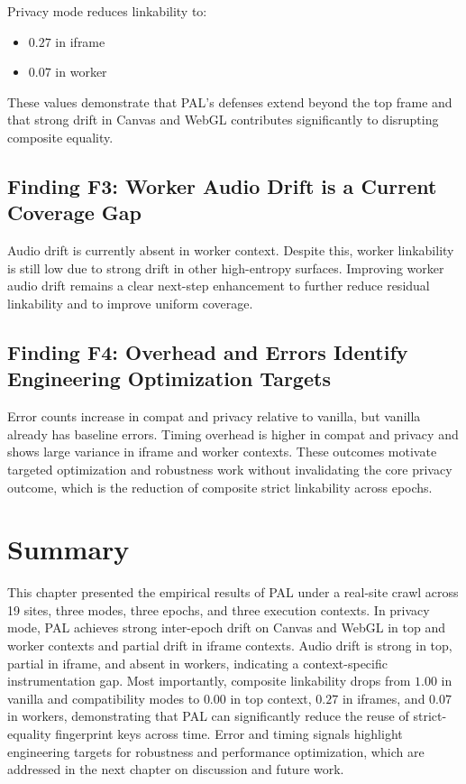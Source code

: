 \documentclass[11pt]{report}
\begin{document}
Privacy mode reduces linkability to:
\begin{itemize}
    \item $0.27$ in iframe
    \item $0.07$ in worker
\end{itemize}

These values demonstrate that PAL’s defenses extend beyond the top frame and that strong drift in Canvas and WebGL contributes significantly to disrupting composite equality.

\subsection{Finding F3: Worker Audio Drift is a Current Coverage Gap}

Audio drift is currently absent in worker context. Despite this, worker linkability is still low due to strong drift in other high-entropy surfaces. Improving worker audio drift remains a clear next-step enhancement to further reduce residual linkability and to improve uniform coverage.

\subsection{Finding F4: Overhead and Errors Identify Engineering Optimization Targets}

Error counts increase in compat and privacy relative to vanilla, but vanilla already has baseline errors. Timing overhead is higher in compat and privacy and shows large variance in iframe and worker contexts. These outcomes motivate targeted optimization and robustness work without invalidating the core privacy outcome, which is the reduction of composite strict linkability across epochs.

\section{Summary}

This chapter presented the empirical results of PAL under a real-site crawl across 19 sites, three modes, three epochs, and three execution contexts. In privacy mode, PAL achieves strong inter-epoch drift on Canvas and WebGL in top and worker contexts and partial drift in iframe contexts. Audio drift is strong in top, partial in iframe, and absent in workers, indicating a context-specific instrumentation gap. Most importantly, composite linkability drops from $1.00$ in vanilla and compatibility modes to $0.00$ in top context, $0.27$ in iframes, and $0.07$ in workers, demonstrating that PAL can significantly reduce the reuse of strict-equality fingerprint keys across time. Error and timing signals highlight engineering targets for robustness and performance optimization, which are addressed in the next chapter on discussion and future work.
\end{document}
